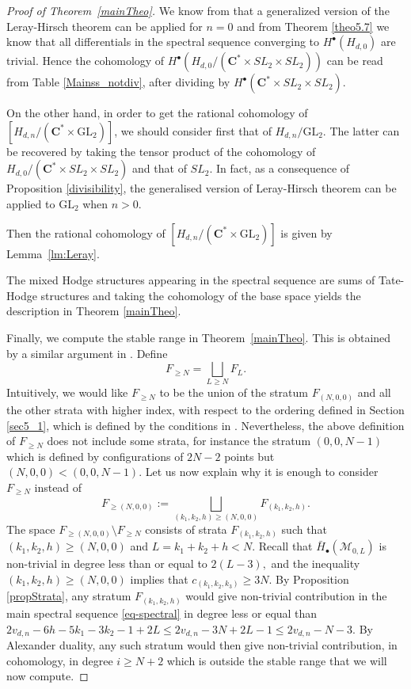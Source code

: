\documentclass[10pt,a4paper,twoside]{amsart}
\theoremstyle{plain}
\theoremstyle{definition}
\theoremstyle{remark}
\begin{document}
\begin{proof}[Proof of Theorem~\ref{mainTheo}]

We know from \cite[Section 3.1]{TomM4} that a generalized version of the Leray-Hirsch theorem can be applied for $n=0$ 
and from Theorem \ref{theo5.7} we know that all differentials in the spectral sequence converging to $H^\bullet(H_{d,0})$ are trivial. Hence the cohomology of $H^\bullet(H_{d,0}/(\mathbf{C}^*\times SL_2\times SL_2))$ can be read from Table \ref{Mainss_notdiv}, after dividing by  $H^\bullet(\mathbf{C}^*\times SL_2\times SL_2)$. 

On the other hand, in order to get the rational cohomology of $\left[H_{d,n}/(\mathbf{C}^*\times \mathrm{GL}_2)\right]$, we should consider first that of $H_{d,n}/\mathrm{GL}_2$. The latter can be recovered by taking the tensor product of the cohomology of $H_{d,0}/(\mathbf{C}^*\times SL_2\times SL_2)$ and that of $SL_2$. In fact, as a consequence of Proposition \ref{divisibility}, the generalised version of Leray-Hirsch theorem can be applied to $\mathrm{GL}_2$ when $n>0$. 

Then the rational cohomology of $\left[H_{d,n}/(\mathbf{C}^*\times \mathrm{GL}_2)\right]$ is given by Lemma~\ref{lm:Leray}.


The mixed Hodge structures appearing in the spectral sequence are sums of Tate-Hodge structures and taking the cohomology of the base space yields the description in Theorem \ref{mainTheo}.

Finally, we compute the stable range in Theorem~\ref{mainTheo}. This is obtained by a similar argument in \cite[Section 3]{Zhe}. 
Define $$F_{\geq N}=\bigsqcup_{L\geq N} F_L.$$ 
Intuitively, we would like $F_{\geq N}$ to be the union of the stratum $F_{(N,0,0)}$ and all the other strata with higher index, with respect to the ordering defined in Section \ref{sec5_1}, which is defined by the conditions in \cite[List 2.3]{TomM4}. Nevertheless, the above definition of $F_{\geq N}$ does not include some strata, for instance the stratum $(0,0,N-1)$ which is defined by configurations of $2N-2$ points but $(N,0,0)<(0,0,N-1).$
Let us now explain why it is enough to consider $F_{\geq N}$ instead of $$F_{\geq (N,0,0)}:=\bigsqcup_{(k_1,k_2,h)\geq (N,0,0)}F_{(k_1,k_2,h)}.$$
The space $F_{\geq (N,0,0)}\setminus F_{\geq N}$ consists of strata 
$F_{(k_1,k_2,h)}$
such that $(k_1,k_2,h)\geq(N,0,0)$ and $L=k_1+k_2+h<N.$
Recall that $\bar{H}_\bullet(\mathcal{M}_{0,L})$ is non-trivial in degree less than or equal to $2(L-3),$ and the inequality $(k_1,k_2,h)\geq(N,0,0)$ implies that $c_{(k_1,k_2,k_3)}\geq 3N$. 
By Proposition \ref{propStrata}, any stratum $F_{(k_1,k_2,h)}$
would give non-trivial contribution in the main spectral sequence \eqref{eq-spectral} in degree less or equal than $2v_{d,n}-6h-5k_1-3k_2-1+2L\leq 2v_{d,n}-3N+2L-1\leq 2v_{d,n}-N-3$. By Alexander duality, any such stratum would then give non-trivial contribution, in cohomology, in degree $i\geq N+2$ which is outside the stable range that we will now compute. 


\end{proof}
\end{document}
